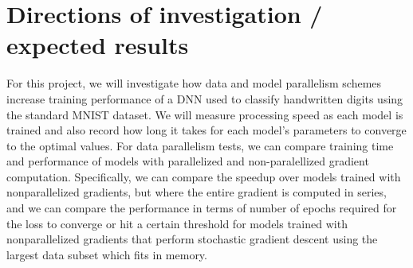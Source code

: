 \documentclass{article}
\begin{document}
\section{Directions of investigation / expected results}
For this project, we will investigate how data and model parallelism schemes increase training performance of a DNN used to classify handwritten digits using the standard MNIST dataset. %
We will measure processing speed as each model is trained and also record how long it takes for each model's parameters to converge to the optimal values. For data parallelism tests, we can compare training time and performance of models with parallelized and non-paralellized gradient computation. Specifically, we can compare the speedup over models trained with nonparallelized gradients, but where the entire gradient is computed in series, and we can compare the performance in terms of number of epochs required for the loss to converge or hit a certain threshold for models trained with nonparallelized gradients that perform stochastic gradient descent using the largest data subset which fits in memory.




\end{document}
